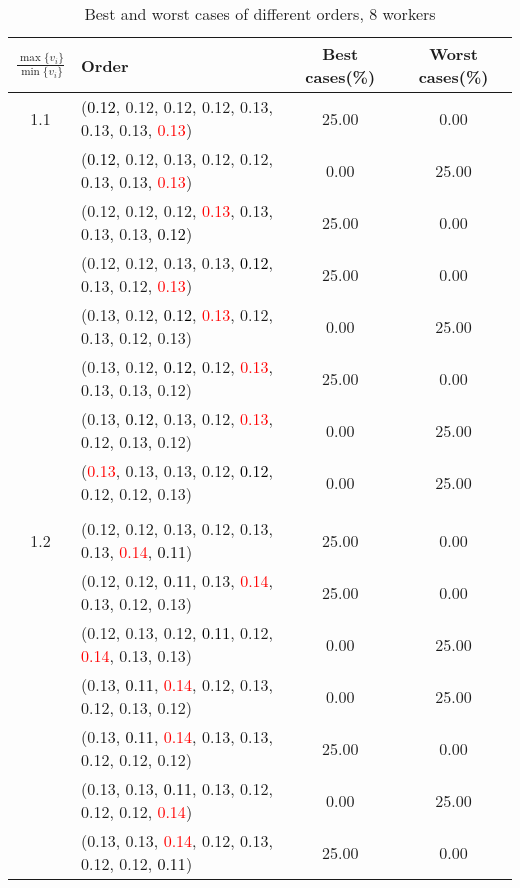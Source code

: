 \documentclass[10pt,a4paper]{report}
\begin{document}
\newpage\begin{center}
	\small
	\begin{longtable}{clcc}
		\caption{Best and worst cases of different orders, 8 workers}\\
		\toprule
		\setlength{\tabcolsep}{1mm}
		\renewcommand\baselinestretch{0.5}\selectfont
		$\frac{\max\{v_i\}}{\min\{v_i\}}$ & Order & Best cases(\%) & Worst cases(\%) \\
			\midrule		1.1			&(\textcolor{black}{0.12}, 0.12, 0.12, 0.12, 0.13, 0.13, 0.13, \textcolor{red}{0.13})&25.00&0.00\\
			&(\textcolor{black}{0.12}, 0.12, 0.13, 0.12, 0.12, 0.13, 0.13, \textcolor{red}{0.13})&0.00&25.00\\
			&(0.12, 0.12, 0.12, \textcolor{red}{0.13}, 0.13, 0.13, 0.13, \textcolor{black}{0.12})&25.00&0.00\\
			&(0.12, 0.12, 0.13, 0.13, \textcolor{black}{0.12}, 0.13, 0.12, \textcolor{red}{0.13})&25.00&0.00\\
			&(0.13, 0.12, \textcolor{black}{0.12}, \textcolor{red}{0.13}, 0.12, 0.13, 0.12, 0.13)&0.00&25.00\\
			&(0.13, 0.12, \textcolor{black}{0.12}, 0.12, \textcolor{red}{0.13}, 0.13, 0.13, 0.12)&25.00&0.00\\
			&(0.13, \textcolor{black}{0.12}, 0.13, 0.12, \textcolor{red}{0.13}, 0.12, 0.13, 0.12)&0.00&25.00\\
			&(\textcolor{red}{0.13}, 0.13, 0.13, 0.12, \textcolor{black}{0.12}, 0.12, 0.12, 0.13)&0.00&25.00\\
		&&&\\
		1.2			&(0.12, 0.12, 0.13, 0.12, 0.13, 0.13, \textcolor{red}{0.14}, \textcolor{black}{0.11})&25.00&0.00\\
			&(0.12, 0.12, \textcolor{black}{0.11}, 0.13, \textcolor{red}{0.14}, 0.13, 0.12, 0.13)&25.00&0.00\\
			&(0.12, 0.13, 0.12, \textcolor{black}{0.11}, 0.12, \textcolor{red}{0.14}, 0.13, 0.13)&0.00&25.00\\
			&(0.13, \textcolor{black}{0.11}, \textcolor{red}{0.14}, 0.12, 0.13, 0.12, 0.13, 0.12)&0.00&25.00\\
			&(0.13, \textcolor{black}{0.11}, \textcolor{red}{0.14}, 0.13, 0.13, 0.12, 0.12, 0.12)&25.00&0.00\\
			&(0.13, 0.13, \textcolor{black}{0.11}, 0.13, 0.12, 0.12, 0.12, \textcolor{red}{0.14})&0.00&25.00\\
			&(0.13, 0.13, \textcolor{red}{0.14}, 0.12, 0.13, 0.12, 0.12, \textcolor{black}{0.11})&25.00&0.00\\

\end{longtable}
\end{center}
\end{document}
